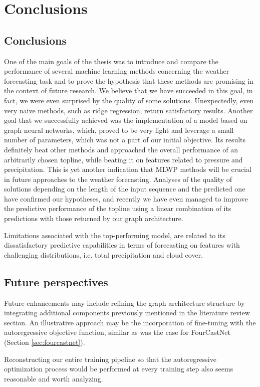 \chapter{Conclusions}
\section{Conclusions}
One of the main goals of the thesis was to introduce and compare the performance of several machine learning methods concerning the weather forecasting task and to prove the hypothesis that these methods are promising in the context of future research. We believe that we have succeeded in this goal, in fact, we were even surprised by the quality of some solutions. Unexpectedly, even very naive methods, such as ridge regression, return satisfactory results. Another goal that we successfully achieved was the implementation of a model based on graph neural networks, which, proved to be very light and leverage a small number of parameters, which was not a part of our initial objective. Its results definitely beat other methods and approached the overall performance of an arbitrarily chosen topline, while beating it on features related to pressure and precipitation. This is yet another indication that MLWP methods will be crucial in future approaches to the weather forecasting. Analyses of the quality of solutions depending on the length of the input sequence and the predicted one have confirmed our hypotheses, and recently we have even managed to improve the predictive performance of the topline using a linear combination of its predictions with those returned by our graph architecture.

Limitations associated with the top-performing model, are related to its dissatisfactory predictive capabilities in terms of forecasting on features with challenging distributions, i.e. total precipitation and cloud cover.

\section{Future perspectives}
Future enhancements may include refining the graph architecture structure by integrating additional components previously mentioned in the literature review section. An illustrative approach may be the incorporation of fine-tuning with the autoregressive objective function, similar as was the case for FourCastNet (Section \ref{sec:fourcastnet}). 


Reconstructing our entire training pipeline so that the autoregressive optimization process would be performed at every training step also seems reasonable and worth analyzing. 


